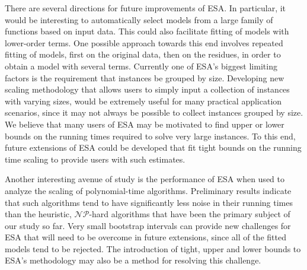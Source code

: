 \documentclass[aic]{iosart2x}
\begin{document}
There are several directions for future improvements of ESA. In particular, it would be interesting to automatically select models from a large family of functions based on input data. This could also facilitate fitting of models with lower-order terms. One possible approach towards this end involves repeated fitting of models, first on the original data, then on the residues, in order to obtain a model with several terms. %
Currently one of ESA's biggest limiting factors is the requirement that instances be grouped by size. Developing new scaling methodology that allows users to simply input a collection of instances with varying sizes, would be extremely useful for many practical application scenarios, since it may not always be possible to collect instances grouped by size. We believe that many users of ESA may be motivated to find upper or lower bounds on the running times required to solve very large instances. To this end, future extensions of ESA could be developed that fit tight bounds on the running time scaling to provide users with such estimates.

Another interesting avenue of study is the performance of ESA when used to analyze the scaling of polynomial-time algorithms. Preliminary results indicate that such algorithms tend to have significantly less noise in their running times than the heuristic, $\mathcal{NP}$-hard algorithms that have been the primary subject of our study so far. Very small bootstrap intervals can provide new challenges for ESA that will need to be overcome in future extensions, since all of the fitted models tend to be rejected. The introduction of tight, upper and lower bounds to ESA's methodology may also be a method for resolving this challenge.
\end{document}
